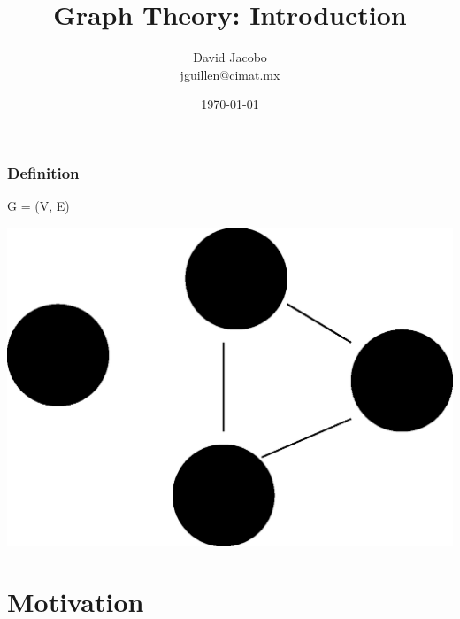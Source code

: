 \documentclass[article]{beamer}
\title{Graph Theory: Introduction}
\author{David Jacobo \\ \href{mailto:jguillen@cimat.mx}{jguillen@cimat.mx}}
\date{\scriptsize{\today}}
\begin{document}
\maketitle
			
\begin{frame}
\frametitle{Definition}
\begin{center}
\huge
	G = (V, E)
	
\vspace{8mm}	
	
\includegraphics[scale=0.3]{./figures/graph.eps}
\end{center}
\end{frame}


\section{Motivation}
\end{document}
